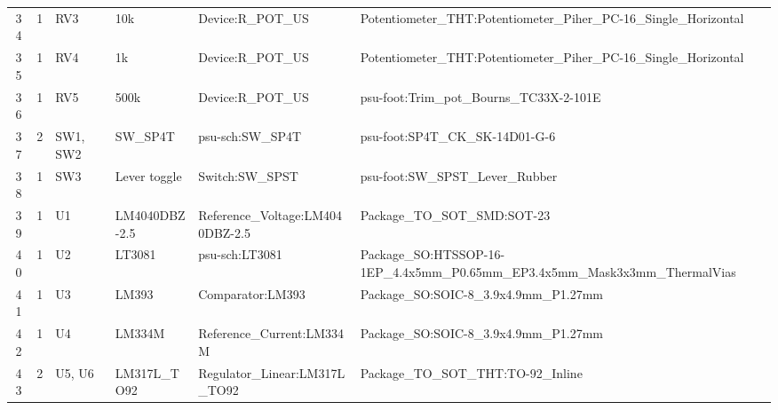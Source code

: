 \documentclass[letterpaper,twocolumn,11pt]{article}
\begin{document}
\begin{sidewaystable*}[ht]
{\begin{tabular}{cclllll}
      34                     & 1                                                        & RV3                    & 10k                    & Device:R\_POT\_US                & Potentiometer\_THT:Potentiometer\_Piher\_PC-16\_Single\_Horizontal                                      \\
      35                     & 1                                                        & RV4                    & 1k                     & Device:R\_POT\_US                & Potentiometer\_THT:Potentiometer\_Piher\_PC-16\_Single\_Horizontal                                      \\
      36                     & 1                                                        & RV5                    & 500k                   & Device:R\_POT\_US                & psu-foot:Trim\_pot\_Bourns\_TC33X-2-101E                                                                \\
      37                     & 2                                                        & SW1, SW2               & SW\_SP4T               & psu-sch:SW\_SP4T                 & psu-foot:SP4T\_CK\_SK-14D01-G-6                                                                         \\
      38                     & 1                                                        & SW3                    & Lever toggle           & Switch:SW\_SPST                  & psu-foot:SW\_SPST\_Lever\_Rubber                                                                        \\
      39                     & 1                                                        & U1                     & LM4040DBZ-2.5          & Reference\_Voltage:LM4040DBZ-2.5 & Package\_TO\_SOT\_SMD:SOT-23                                                                            \\
      40                     & 1                                                        & U2                     & LT3081                 & psu-sch:LT3081                   & Package\_SO:HTSSOP-16-1EP\_4.4x5mm\_P0.65mm\_EP3.4x5mm\_Mask3x3mm\_ThermalVias                          \\
      41                     & 1                                                        & U3                     & LM393                  & Comparator:LM393                 & Package\_SO:SOIC-8\_3.9x4.9mm\_P1.27mm                                                                  \\
      42                     & 1                                                        & U4                     & LM334M                 & Reference\_Current:LM334M        & Package\_SO:SOIC-8\_3.9x4.9mm\_P1.27mm                                                                  \\
      43                     & 2
      & U5, U6                 & LM317L\_TO92           &
      Regulator\_Linear:LM317L\_TO92   & Package\_TO\_SOT\_THT:TO-92\_Inline
      \\
      \bottomrule
  \end{tabular}}
\end{sidewaystable*}
\clearpage
\end{document}
